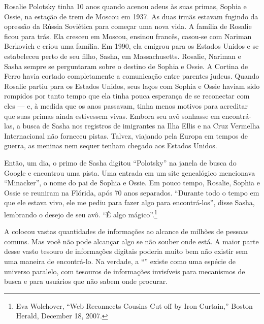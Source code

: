 Rosalie Polotsky tinha 10 anos quando acenou adeus às suas primas, Sophia e Ossie, na estação
de trem de Moscou em 1937. As duas irmãs estavam fugindo da opressão da Rússia Soviética para
começar uma nova vida. A família de Rosalie ficou para trás. Ela cresceu em Moscou, ensinou
francês, casou-se com Nariman Berkovich e criou uma família. Em 1990, ela emigrou para os
Estados Unidos e se estabeleceu perto de seu filho, Sasha, em Massachusetts. Rosalie, Nariman
e Sasha sempre se perguntaram sobre o destino de Sophia e Ossie. A Cortina de Ferro havia
cortado completamente a comunicação entre parentes judeus. Quando Rosalie partiu para os
Estados Unidos, seus laços com Sophia e Ossie haviam sido rompidos por tanto tempo que ela
tinha pouca esperança de se reconectar com eles --- e, à medida que os anos passavam, tinha
menos motivos para acreditar que suas primas ainda estivessem vivas. Embora seu avô sonhasse
em encontrá-las, a busca de Sasha nos registros de imigrantes na Ilha Ellis e na Cruz Vermelha
Internacional não forneceu pistas. Talvez, viajando pela Europa em tempos de guerra, as
meninas nem sequer tenham chegado aos Estados Unidos.

Então, um dia, o primo de Sasha digitou ``Polotsky'' na janela de busca do Google e encontrou
uma pista. Uma entrada em um site genealógico mencionava ``Minacker'', o nome do pai de Sophia
e Ossie. Em pouco tempo, Rosalie, Sophia e Ossie se reuniram na Flórida, após 70 anos
separados. ``Durante todo o tempo em que ele estava vivo, ele me pediu para fazer algo para
encontrá-los'', disse Sasha, lembrando o desejo de seu avô. ``É algo mágico''.\footnote{Eva
Wolchover, ``Web Reconnects Cousins Cut off by Iron Curtain,'' Boston Herald, December 18,
2007.}

A  colocou vastas quantidades de informações ao alcance de milhões de
pessoas comuns. Mas você não pode alcançar algo se não souber onde está. A maior parte desse
vasto tesouro de informações digitais poderia muito bem não existir sem uma maneira de
encontrá-lo. Na verdade, a ``'' existe como uma espécie de universo paralelo,
com tesouros de informações invisíveis para mecanismos de busca e para usuários que não sabem
onde procurar.

